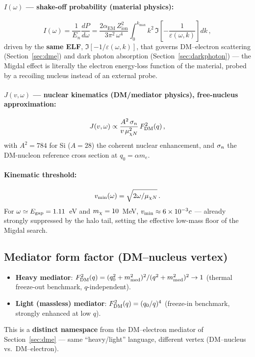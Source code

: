 \paragraph{$I(\omega)$ — shake-off probability (material physics):}
\begin{equation}
I(\omega) = \frac{1}{E_n}\frac{dP}{d\omega}
= \frac{2\alpha_\mathrm{EM}\,Z_\mathrm{ion}^2}{3\pi^2\,\omega^4}
\int_0^{k_\mathrm{max}} k^2\,\Im\!\left[-\frac{1}{\varepsilon(\omega,k)}\right] dk\,,
\end{equation}
driven by the \textbf{same ELF}, $\Im[-1/\varepsilon(\omega,k)]$, that
governs DM--electron scattering (Section~\ref{sec:dme}) and dark photon
absorption (Section~\ref{sec:darkphoton}) — the Migdal effect is literally
the electron energy-loss function of the material, probed by a recoiling
nucleus instead of an external probe.

\paragraph{$J(v,\omega)$ — nuclear kinematics (DM/mediator physics),
free-nucleus approximation:}
\begin{equation}
J(v,\omega) \propto \frac{A^2\,\sigma_n}{v\,\mu_{\chi N}^2}\,F_\mathrm{DM}^2(q)\,,
\end{equation}
with $A^2=784$ for Si ($A=28$) the coherent nuclear enhancement, and
$\sigma_n$ the DM-nucleon reference cross section at $q_0=\alpha m_e$.

\paragraph{Kinematic threshold:}
\begin{equation}
v_\mathrm{min}(\omega) = \sqrt{2\omega/\mu_{\chi N}}\,.
\end{equation}
For $\omega\simeq E_\mathrm{gap}=1.11$~eV and $m_\chi=10$~MeV, $v_\mathrm{min}\approx6\times10^{-3}c$
— already strongly suppressed by the halo tail, setting the effective
low-mass floor of the Migdal search.

\subsection{Mediator form factor (DM--nucleus vertex)}

\begin{itemize}[leftmargin=*]
  \item \textbf{Heavy mediator}: $F_\mathrm{DM}^2(q) = (q_0^2+m_\mathrm{med}^2)^2/(q^2+m_\mathrm{med}^2)^2
  \to 1$ (thermal freeze-out benchmark, $q$-independent).
  \item \textbf{Light (massless) mediator}: $F_\mathrm{DM}^2(q) = (q_0/q)^4$
  (freeze-in benchmark, strongly enhanced at low $q$).
\end{itemize}
This is a \textbf{distinct namespace} from the DM--electron mediator of
Section~\ref{sec:dme} — same ``heavy/light'' language, different vertex
(DM--nucleus vs.\ DM--electron).

